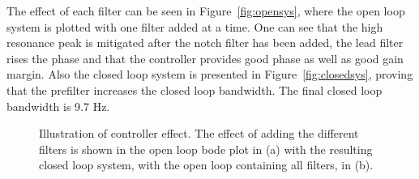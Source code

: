 The effect of each filter can be seen in Figure~\ref{fig:opensys}, where the open loop system is plotted with one filter added at a time. One can see that the high resonance peak is mitigated after the notch filter has been added, the lead filter rises the phase and that the \abbrPID controller provides good phase as well as good gain margin. Also the closed loop system is presented in Figure~\ref{fig:closedsys}, proving that the prefilter increases the closed loop bandwidth. The final closed loop bandwidth is 9.7 Hz.

\begin{figure}[h!]
  \centering %
  \qquad
  \caption{\label{fig:open_and_closed_sys} Illustration of controller effect. The effect of adding the different filters is shown in the open loop bode plot in (a) with the resulting closed loop system, with the open loop containing all filters, in (b). }
\end{figure}
